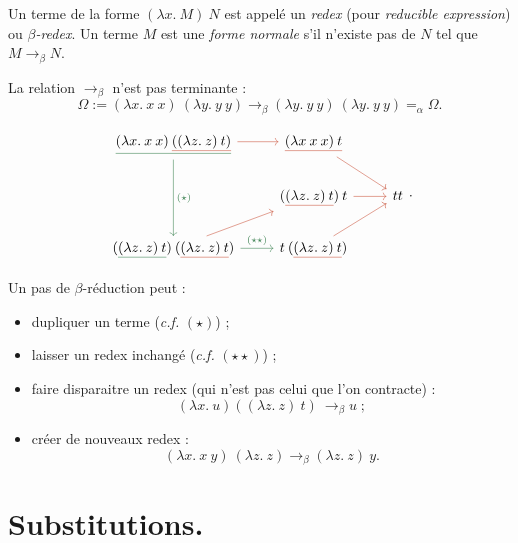 \documentclass[./main]{subfiles}
\begin{document}
  \begin{defn}
    Un terme de la forme $(\lambda x. \: M)\: N$ est appelé un  \textit{redex} (pour \textit{reducible expression}) ou  \textit{$\beta$-redex}.
    Un terme $M$ est une \textit{forme normale}  s'il n'existe pas de $N$ tel que $M \to_\beta N$.
  \end{defn}

  \begin{rmk}
    La relation $\to_\beta$ n'est pas terminante :
    \[
      \Omega := (\lambda x.\: x \: x) \: (\lambda y.\: y \: y) \to_\beta (\lambda y.\: y \: y) \: (\lambda y.\: y \: y) =_\alpha \Omega
    .\] 
  \end{rmk}

  \begin{exm} \label{exm:multiple-paths-beta}
    \[
    \begin{tikzcd}
      \colorunderline{deepgreen}{(\lambda x.\: x \: x) \: \colorunderline{nicered}{((\lambda z.\: z) \: t)}}
      \arrow[deepgreen]{dd}{(\star)}
      \arrow[nicered]{r}{}
      & \arrow[nicered]{dr}{} \colorunderline{nicered}{(\lambda x\: x \: x) \: t}\\
      & (\colorunderline{nicered}{(\lambda z.\: z)\: t}) \: t \arrow[nicered]{r}{} & t t\\
      (\colorunderline{deepgreen}{(\lambda z.\: z) \: t}) \: (\colorunderline{nicered}{(\lambda z.\: z) \: t}) \arrow[deepgreen]{r}{(\star\star)} \arrow[nicered]{ur}{} & t \: (\colorunderline{nicered}{(\lambda z.\: z)\: t}) \arrow[nicered]{ur}{}
    \end{tikzcd}
    .\]
  \end{exm}

  Un pas de $\beta$-réduction peut :
  \begin{itemize}
    \item dupliquer un terme (\textit{c.f.} $(\star)$) ;
    \item laisser un redex inchangé (\textit{c.f.} $(\star\star)$) ;
    \item faire disparaitre un redex (qui n'est pas celui que l'on contracte) :
      \[
        (\lambda x. \: u) ((\lambda z. \: z) \: t) \: \to_\beta u \;
      ;\]
    \item créer de nouveaux redex :
      \[
        (\lambda x. \: x \: y) \: (\lambda z. \: z) \to_\beta (\lambda z. \: z)\: y
      .\]
  \end{itemize}

  \section{Substitutions.}
\end{document}
